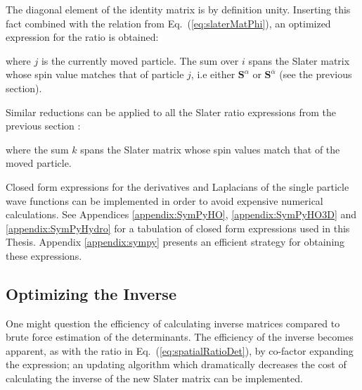 The diagonal element of the identity matrix is by definition unity. Inserting this fact combined with the relation from Eq.~(\ref{eq:slaterMatPhi}), an optimized expression for the ratio is obtained:


where $j$ is the currently moved particle. The sum over $i$ spans the Slater matrix whose spin value matches that of particle $j$, i.e either $\mathbf{S}^\alpha$ or $\mathbf{S}^{\overline{\alpha}}$ (see the previous section).

Similar reductions can be applied to all the Slater ratio expressions from the previous section \cite{abInitioMC, morten}:


where the sum $k$ spans the Slater matrix whose spin values match that of the moved particle.

Closed form expressions for the derivatives and Laplacians of the single particle wave functions can be implemented in order to avoid expensive numerical calculations. See Appendices \ref{appendix:SymPyHO}, \ref{appendix:SymPyHO3D} and \ref{appendix:SymPyHydro} for a tabulation of closed form expressions used in this Thesis. Appendix \ref{appendix:sympy} presents an efficient strategy for obtaining these expressions.

\subsection{Optimizing the Inverse}
\label{sec:optInv}

One might question the efficiency of calculating inverse matrices compared to brute force estimation of the determinants. The efficiency of the inverse becomes apparent, as with the ratio in Eq.~(\ref{eq:spatialRatioDet}), by co-factor expanding the expression; an updating algorithm which dramatically decreases the cost of calculating the inverse of the new Slater matrix can be implemented.

